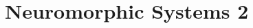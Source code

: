 \documentclass[main]{subfiles}
\begin{document}
\newpage
\section{Neuromorphic Systems 2}
\end{document}
